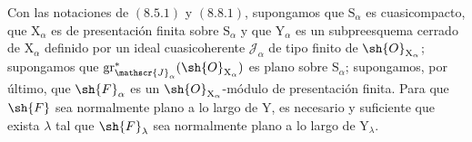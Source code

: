 \begin{proposition}[11.3.6]
\label{IV.11.3.6}
Con las notaciones de $(8.5.1)$ y $(8.8.1)$, supongamos que $\mathrm{S}_\alpha$ es cuasicompacto, que $\mathrm{X}_\alpha$ es de presentación finita sobre $\mathrm{S}_\alpha$ y que $\mathrm{Y}_\alpha$ es un subpreesquema cerrado de $\mathrm{X}_\alpha$ definido por un ideal cuasicoherente $\mathscr{J}_\alpha$ de tipo finito de $\sh{O}_{\mathrm{X}_\alpha}$; supongamos que $\operatorname{gr}^*_{\mathscr{J}_\alpha}(\sh{O}_{\mathrm{X}_\alpha})$ es plano sobre $\mathrm{S}_\alpha$; supongamos, por último, que $\sh{F}_\alpha$ es un $\sh{O}_{\mathrm{X}_\alpha}$-módulo de presentación finita. Para que $\sh{F}$ sea normalmente plano a lo largo de $\mathrm{Y}$, es necesario y suficiente que exista $\lambda$ tal que $\sh{F}_\lambda$ sea normalmente plano a lo largo de $\mathrm{Y}_\lambda$.
\end{proposition}

